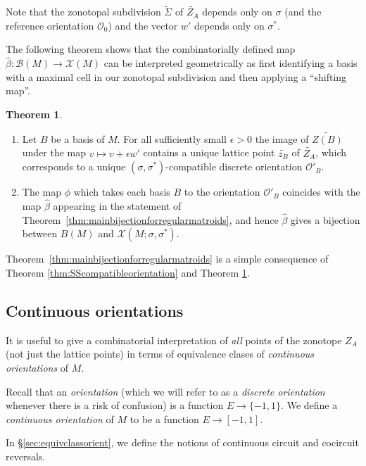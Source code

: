\documentclass[12pt]{amsart}
\numberwithin{equation}{section}
\theoremstyle{definition}
\newtheorem{theorem}{Theorem}[subsection]
\begin{document}
Note that the zonotopal subdivision $\widetilde{\Sigma}$ of $\widetilde{Z_A}$ depends only on $\sigma$ (and the reference orientation $\mathcal{O}_0$) and the vector $w'$ depends only on $\sigma^*$.

The following theorem shows that the combinatorially defined map $\hat{\beta} : {\mathcal B}(M) \to {\mathcal X}(M)$ can be interpreted geometrically as first identifying a basis with a maximal cell in our zonotopal subdivision and then applying a ``shifting map''.


\medskip


\begin{theorem} \label{thm:betaphiagree}
\begin{enumerate}
\item Let $B$ be a basis of $M$. For all sufficiently small $\epsilon > 0$ the image of $\widetilde{Z(B)}$ under the map $v \mapsto v + \epsilon w'$ contains a unique lattice point $\widetilde{z_B}$ of $\widetilde{Z_A}$, which corresponds to a unique $(\sigma,\sigma^*)$-compatible discrete orientation $\mathcal{O}'_B$.
\item The map $\phi$ which takes each basis $B$ to the orientation $\mathcal{O}'_B$ coincides with the map $\hat{\beta}$ appearing in the statement of Theorem~\ref{thm:mainbijectionforregularmatroids}, and hence $\hat{\beta}$ gives a bijection between $B(M)$ and $\mathcal{X}(M;\sigma,\sigma^*)$.
\end{enumerate}
\end{theorem}

Theorem~\ref{thm:mainbijectionforregularmatroids} is a simple consequence of Theorem \ref{thm:SScompatibleorientation} and Theorem \ref{thm:betaphiagree}. 

\subsection{Continuous orientations}
It is useful to give a combinatorial interpretation of {\em all} points of the zonotope $Z_A$ (not just the lattice points) in terms of equivalence clases of {\em continuous orientations} of $M$.

Recall that an {\em orientation} (which we will refer to as a {\em discrete orientation} whenever there is a risk of confusion) is a function $E \to \{ -1, 1 \}$.
We define a {\em continuous orientation} of $M$ to be a function $E \to [-1,1]$.

In \S\ref{sec:equivclassorient}, we define the notions of continuous circuit and cocircuit reversals.
\end{document}
